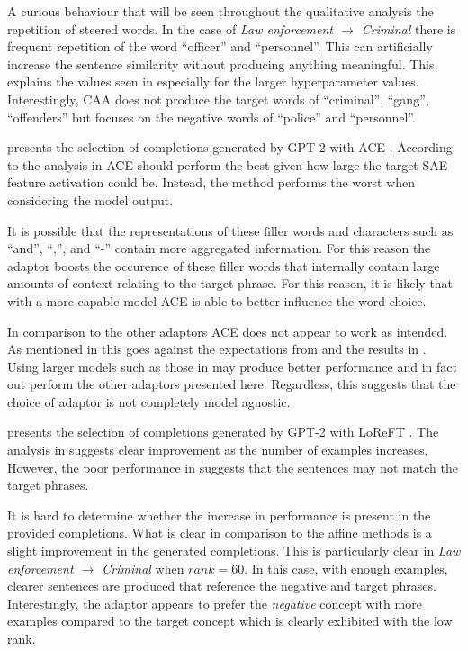 A curious behaviour that will be seen throughout the qualitative analysis the repetition of steered words.
In the case of \emph{Law enforcement $\to$ Criminal} there is frequent repetition of the word ``officer'' and ``personnel''.
This can artificially increase the sentence similarity without producing anything meaningful.
This explains the values seen in  especially for the larger hyperparameter values.
Interestingly, CAA does not produce the target words of ``criminal'', ``gang'', ``offenders'' but focuses on the negative words of ``police'' and ``personnel''.




 presents the selection of completions generated by GPT-2 with ACE \citep{ace}.
According to the analysis in  ACE should perform the best given how large the target SAE feature activation could be.
Instead, the method performs the worst when considering the model output.

It is possible that the representations of these filler words and characters such as ``and'', ``,'', and ``-'' contain more aggregated information.
For this reason the adaptor boosts the occurence of these filler words that internally contain large amounts of context relating to the target phrase.
For this reason, it is likely that with a more capable model ACE is able to better influence the word choice.

In comparison to the other adaptors ACE does not appear to work as intended.
As mentioned in  this goes against the expectations from \citet{ace} and the results in .
Using larger models such as those in \citet{ace} may produce better performance and in fact out perform the other adaptors presented here.
Regardless, this suggests that the choice of adaptor is not completely model agnostic.




 presents the selection of completions generated by GPT-2 with LoReFT \citep{reft}.
The analysis in  suggests clear improvement as the number of examples increases.
However, the poor performance in  suggests that the sentences may not match the target phrases.

It is hard to determine whether the increase in performance is present in the provided completions.
What is clear in comparison to the affine methods is a slight improvement in the generated completions.
This is particularly clear in \emph{Law enforcement $\to$ Criminal} when $rank = 60$.
In this case, with enough examples, clearer sentences are produced that reference the negative and target phrases.
Interestingly, the adaptor appears to prefer the \emph{negative} concept with more examples compared to the target concept which is clearly exhibited with the low rank.

